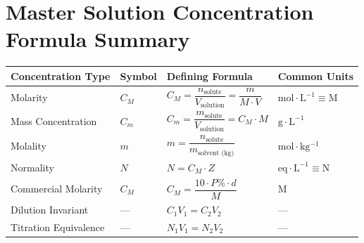 \section{Master Solution Concentration Formula Summary}

\begin{center}
\renewcommand{\arraystretch}{1.4}
\begin{tabular}{@{}llll@{}}
\toprule
\textbf{Concentration Type} & \textbf{Symbol} & \textbf{Defining Formula} & \textbf{Common Units} \\
\midrule
Molarity & $C_M$ & $C_M = \dfrac{n_{\text{solute}}}{V_{\text{solution}}} = \dfrac{m}{M \cdot V}$ & $\mathrm{mol\cdot L^{-1}} \equiv \mathrm{M}$ \\
Mass Concentration & $C_m$ & $C_m = \dfrac{m_{\text{solute}}}{V_{\text{solution}}} = C_M \cdot M$ & $\mathrm{g\cdot L^{-1}}$ \\
Molality & $m$ & $m = \dfrac{n_{\text{solute}}}{m_{\text{solvent (kg)}}}$ & $\mathrm{mol\cdot kg^{-1}}$ \\
Normality & $N$ & $N = C_M \cdot Z$ & $\mathrm{eq\cdot L^{-1}} \equiv \mathrm{N}$ \\
Commercial Molarity & $C_M$ & $C_M = \dfrac{10 \cdot P\% \cdot d}{M}$ & $\mathrm{M}$ \\
Dilution Invariant & --- & $C_1 V_1 = C_2 V_2$ & --- \\
Titration Equivalence & --- & $N_1 V_1 = N_2 V_2$ & --- \\
\bottomrule
\end{tabular}
\end{center}
